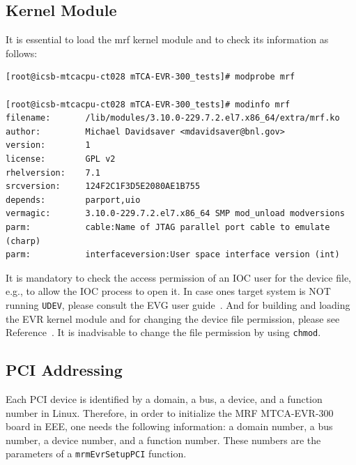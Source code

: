 \documentclass[11pt
  , a4paper
  , article
  , oneside
  , showtrims
]{memoir}
\begin{document}
\subsection{Kernel Module}
It is essential to load the mrf kernel module and to check its information as follows:
\begin{lstlisting}[style=termstyle]
[root@icsb-mtcacpu-ct028 mTCA-EVR-300_tests]# modprobe mrf
  
[root@icsb-mtcacpu-ct028 mTCA-EVR-300_tests]# modinfo mrf
filename:       /lib/modules/3.10.0-229.7.2.el7.x86_64/extra/mrf.ko
author:         Michael Davidsaver <mdavidsaver@bnl.gov>
version:        1
license:        GPL v2
rhelversion:    7.1
srcversion:     124F2C1F3D5E2080AE1B755
depends:        parport,uio
vermagic:       3.10.0-229.7.2.el7.x86_64 SMP mod_unload modversions 
parm:           cable:Name of JTAG parallel port cable to emulate (charp)
parm:           interfaceversion:User space interface version (int)
\end{lstlisting}

It is mandatory to check the access permission of an IOC user for the device file, e.g.,  to allow the IOC process to open it. In case ones target system is NOT running \texttt{UDEV}, please consult the EVG user guide~\cite{EVR-USER-GUIDE}. And for building and loading the EVR kernel module and for changing the device file permission, please see Reference~\citep[see][p12,13]{EVR-USER-GUIDE}. It is inadvisable to change the file permission by using \texttt{chmod}. 

\subsection{PCI Addressing}
Each PCI device is identified by a domain, a bus, a device, and a function number in Linux. Therefore, in order to initialize the MRF MTCA-EVR-300 board in EEE, one needs the following information: a domain number, a bus number, a device number, and a function number. These numbers are the parameters of a \texttt{mrmEvrSetupPCI} function.
\end{document}
